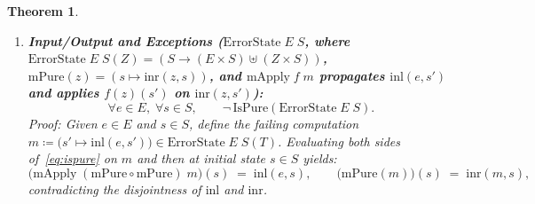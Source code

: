 \documentclass[11pt,a4paper]{article}
\newtheorem{theorem}{Theorem}[section]
\theoremstyle{definition}
\theoremstyle{remark}
\begin{document}
\begin{theorem}
\begin{enumerate}[label=(\arabic*),nosep]
  an outer continuation is a function $K : \mathrm{Cont}\;R(R) \to R$. The left-hand side of
  \eqref{eq:ispure} at $mz = m_1$, applied to any outer continuation $K : \mathrm{Cont}\;R(R) \to R$,
  evaluates to:
  \begin{align*}
    \mathrm{LHS}(K)
    &= \bigl(\mathrm{mApply}\;(\mathrm{mPure} \circ \mathrm{mPure})\;m_1\bigr)(K) \\
    &= m_1\bigl(z \mapsto ((\mathrm{mPure} \circ \mathrm{mPure})(z))(K)\bigr) \;=\; r_1,
  \end{align*}
  because $m_1 = (\_ \mapsto r_1)$ returns $r_1$ regardless of its argument. Conversely, the right-hand
  side of~\eqref{eq:ispure} at $mz = m_1$, applied to $K$, evaluates to:
  \[
    \mathrm{RHS}(K)
    \;=\; \bigl(\mathrm{mPure}(m_1)\bigr)(K)
    \;=\; K(m_1).
  \]
  Now choose the constant outer continuation $K_2 \coloneqq (\_ \mapsto r_2) : \mathrm{Cont}\;R(R) \to R$.
  Evaluating $\mathrm{LHS} = \mathrm{RHS}$ at $K = K_2$ gives
  \[
    r_1 \;=\; \mathrm{LHS}(K_2) \;=\; \mathrm{RHS}(K_2) \;=\; K_2(m_1) \;=\; r_2.
  \]
  \vspace{4pt}
  \item \textbf{Input/Output and Exceptions ($\mathrm{ErrorState}\;E\;S$, where
  $\mathrm{ErrorState}\;E\;S(Z) = (S \to (E \times S) \uplus (Z \times S))$,
  $\mathrm{mPure}(z) = (s \mapsto \mathrm{inr}(z, s))$, and $\mathrm{mApply}\;f\;m$ propagates
  $\mathrm{inl}(e, s')$ and applies $f(z)(s')$ on $\mathrm{inr}(z, s')$):}
  \[
    \forall e \in E,\; \forall s \in S,\qquad \neg\,\mathrm{IsPure}(\mathrm{ErrorState}\;E\;S).
  \]
  \emph{Proof:} Given $e \in E$ and $s \in S$, define the failing computation
  $m \coloneqq \bigl(s' \mapsto \mathrm{inl}(e, s')\bigr) \in \mathrm{ErrorState}\;E\;S(T)$. Evaluating
  both sides of~\eqref{eq:ispure} on $m$ and then at initial state $s \in S$ yields:
  \[
    \bigl(\mathrm{mApply}\;(\mathrm{mPure} \circ \mathrm{mPure})\;m\bigr)(s) \;=\; \mathrm{inl}(e, s),
    \qquad
    \bigl(\mathrm{mPure}(m)\bigr)(s) \;=\; \mathrm{inr}(m, s),
  \]
  contradicting the disjointness of $\mathrm{inl}$ and $\mathrm{inr}$.
\end{enumerate}
\end{theorem}
\end{document}
